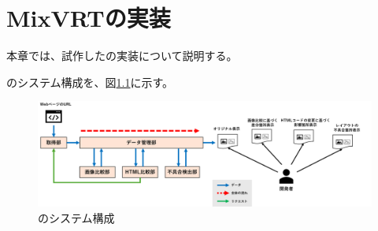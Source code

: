 \chapter{MixVRTの実装}\label{cha:Implementation}
本章では、試作した\toolName の実装について説明する。
\par
\toolName のシステム構成を、図\ref{fig:System}に示す。
\begin{figure}[tp]
    \begin{center}
        \includegraphics[width=1.0\columnwidth]{image/new_System.png}
        \caption{\toolName のシステム構成}
        \label{fig:System}
    \end{center}
\end{figure}
